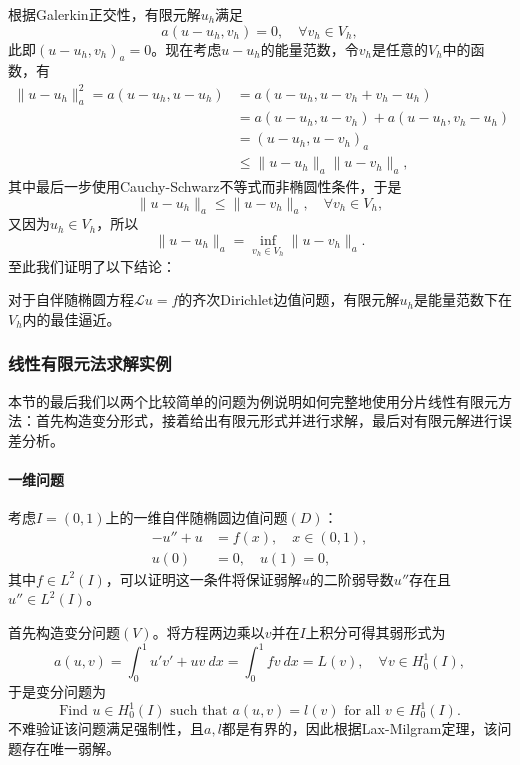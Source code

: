 \documentclass[a4paper,10pt]{ctexart}
\begin{document}
根据Galerkin正交性，有限元解$ u_h $满足
\begin{equation}
    a(u-u_h,v_h) = 0,\quad \forall v_h\in V_h,
\end{equation}
此即$ (u-u_h,v_h)_a = 0 $。现在考虑$ u-u_h $的能量范数，令$ v_h $是任意的$ V_h $中的函数，有
\[
    \begin{aligned}
        \| u-u_h \|_a^2 = a(u-u_h,u-u_h) 
        &= a(u-u_h,u-v_h+v_h-u_h)\\
        &= a(u-u_h,u-v_h) + a(u-u_h,v_h-u_h)\\
        &= (u-u_h,u-v_h)_a\\
        &\leqslant \| u-u_h \|_a \| u-v_h \|_a,
    \end{aligned}
\]
其中最后一步使用Cauchy-Schwarz不等式而非椭圆性条件，于是
\begin{equation}
    \| u-u_h \|_a \leqslant \| u-v_h \|_a,\quad \forall v_h\in V_h,
\end{equation}
又因为$ u_h\in V_h $，所以
\begin{equation}
    \| u-u_h \|_a = \inf_{v_h\in V_h}\| u-v_h \|_a.
\end{equation}
至此我们证明了以下结论：
\begin{theorem}
    对于自伴随椭圆方程$ \mathcal{L}u = f $的齐次Dirichlet边值问题，有限元解$ u_h $是能量范数下在$ V_h $内的最佳逼近。
\end{theorem}

\subsubsection{线性有限元法求解实例}
本节的最后我们以两个比较简单的问题为例说明如何完整地使用分片线性有限元方法：首先构造变分形式，接着给出有限元形式并进行求解，最后对有限元解进行误差分析。
\paragraph*{一维问题}
考虑$ I= (0,1) $上的一维自伴随椭圆边值问题$ (D) $：
\[
    \begin{aligned}
        -u'' + u &= f(x),\quad x\in (0,1),\\
        u(0) &= 0,\quad u(1) = 0,
    \end{aligned}
\]
其中$ f\in L^2(I) $，可以证明这一条件将保证弱解$ u $的二阶弱导数$ u'' $存在且$ u''\in L^2(I) $。

首先构造变分问题$ (V) $。将方程两边乘以$ v $并在$ I $上积分可得其弱形式为
\begin{equation}
    a(u,v) = \int_0^1 u'v' + uv\ dx = \int_0^1 fv\ dx = L(v),\quad \forall v\in H^1_0(I),
\end{equation}
于是变分问题为
\begin{equation}
    \text{Find } u\in H^1_0(I) \text{ such that } a(u,v) = l(v) \text{ for all } v\in H^1_0(I).
\end{equation}
不难验证该问题满足强制性，且$ a,l $都是有界的，因此根据Lax-Milgram定理，该问题存在唯一弱解。
\end{document}
